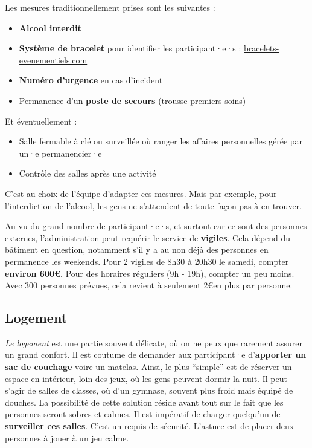 Les mesures traditionnellement prises sont les suivantes :
\begin{itemize}
    \item \textbf{Alcool interdit}
    \item \textbf{Système de bracelet} pour identifier les participant·e·s : \href{https://www.bracelets-evenementiels.com}{bracelets-evenementiels.com}
    \item \textbf{Numéro d'urgence} en cas d'incident
    \item Permanence d'un \textbf{poste de secours} (trousse premiers soins)
\end{itemize}

Et éventuellement :
\begin{itemize}
    \item Salle fermable à clé ou surveillée où ranger les affaires personnelles gérée par un·e permanencier·e
    \item Contrôle des salles après une activité
\end{itemize}

C'est au choix de l'équipe d'adapter ces mesures. Mais par exemple, pour l'interdiction de l'alcool, les gens ne s'attendent de toute façon pas à en trouver.

Au vu du grand nombre de participant·e·s, et surtout car ce sont des personnes externes, l'administration peut requérir le service de \textbf{vigiles}. Cela dépend du bâtiment en question, notamment s'il y a au non déjà des personnes en permanence les weekends. Pour 2 vigiles de 8h30 à 20h30 le samedi, compter \textbf{environ 600\euro}. Pour des horaires réguliers (9h - 19h), compter un peu moins. Avec 300 personnes prévues, cela revient à seulement 2\euro en plus par personne.

\subsection{Logement}\label{sec:logement}

\emph{Le logement} est une partie souvent délicate, où on ne peux que rarement assurer un grand confort. Il est coutume de demander aux participant·e d'\textbf{apporter un sac de couchage} voire un matelas. Ainsi, le plus ``simple'' est de réserver un espace en intérieur, loin des jeux, où les gens peuvent dormir la nuit. Il peut s'agir de salles de classes, où d'un gymnase, souvent plus froid mais équipé de douches. La possibilité de cette solution réside avant tout sur le fait que les personnes seront sobres et calmes. Il est impératif de charger quelqu'un de \textbf{surveiller ces salles}. C'est un requis de sécurité. L'astuce est de placer deux personnes à jouer à un jeu calme.

